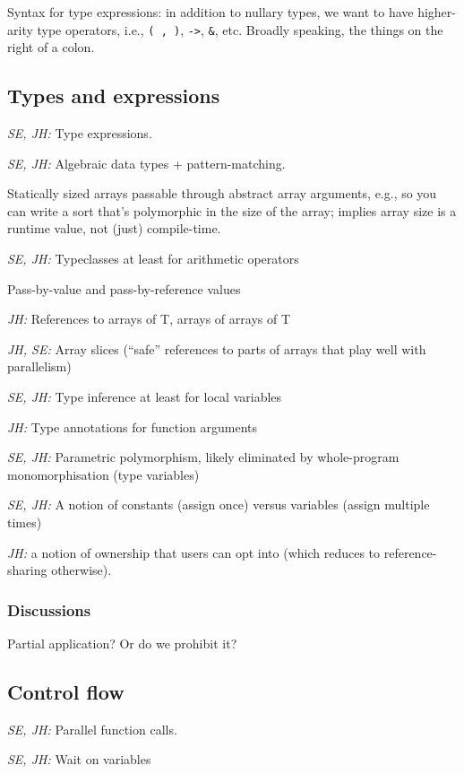 \documentclass{article}
\begin{document}
Syntax for type expressions: in addition to nullary types, we want to have
higher-arity type operators, i.e., \verb|( , )|, \verb|->|, \verb|&|, etc.
Broadly speaking, the things on the right of a colon.

\subsection{Types and expressions}

\textit{SE, JH:} Type expressions.

\textit{SE, JH:} Algebraic data types + pattern-matching.

Statically sized arrays passable through abstract array arguments, e.g., so you
can write a sort that's polymorphic in the size of the array; implies array size
is a runtime value, not (just) compile-time.

\textit{SE, JH:} Typeclasses at least for arithmetic operators

Pass-by-value and pass-by-reference values

\textit{JH:} References to arrays of T, arrays of arrays of T

\textit{JH, SE:} Array slices (``safe'' references to parts of arrays that play
well with parallelism)

\textit{SE, JH:} Type inference at least for local variables

\textit{JH:} Type annotations for function arguments

\textit{SE, JH:} Parametric polymorphism, likely eliminated by whole-program
monomorphisation (type variables)

\textit{SE, JH:} A notion of constants (assign once) versus variables (assign
multiple times)

\textit{JH:} a notion of ownership that users can opt into (which reduces to
reference-sharing otherwise).

\subsubsection{Discussions}

Partial application?  Or do we prohibit it?

\subsection{Control flow}

\textit{SE, JH:} Parallel function calls.

\textit{SE, JH:} Wait on variables
\end{document}
